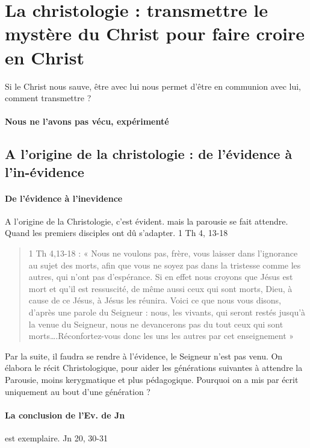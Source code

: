 \section{La christologie : transmettre le mystère du Christ pour faire croire en Christ} 

  Si le Christ nous sauve, être avec lui nous permet d'être en communion avec lui, comment transmettre ?
  
  \paragraph{Nous ne l'avons pas vécu, expérimenté} 
  
    
    
\subsection{A l'origine de la christologie : de l'évidence à
    l'in-évidence}
    
  
  \paragraph{De l'évidence à l'inevidence} A l'origine de la Christologie, c'est évident. mais la parousie se fait attendre. Quand les premiers disciples ont dû s'adapter. 1 Th 4, 13-18 
  \begin{quote}
     1  Th  4,13-18  :  «  Nous  ne  voulons  pas,  frère,  vous  laisser  dans  l’ignorance  au  sujet  des  morts, afin  que  vous  ne  soyez  pas  dans  la  tristesse  comme  les  autres,  qui  n’ont  pas  d’espérance.  Si  en effet  nous  croyons  que  Jésus  est  mort  et  qu’il  est  ressuscité,  de  même  aussi  ceux  qui  sont morts,  Dieu,  à  cause  de  ce  Jésus,  à  Jésus  les  réunira.  Voici  ce  que  nous  vous  disons,  d’après une  parole  du  Seigneur  :  nous,  les  vivants,  qui  seront  restés  jusqu’à  la  venue  du  Seigneur, nous  ne  devancerons  pas  du  tout  ceux  qui  sont  morts….Réconfortez-vous  donc  les  uns  les autres  par cet  enseignement  »   
  \end{quote}
  Par la suite, il faudra se rendre à l'évidence, le Seigneur n'est pas venu. On élabora le récit Christologique, pour aider les générations suivantes à attendre la Parousie, moins kerygmatique et plus pédagogique. Pourquoi on a mis par écrit uniquement au bout d'une génération ?
  
  \paragraph{La conclusion de l'Ev. de Jn} est exemplaire. Jn 20, 30-31
  
